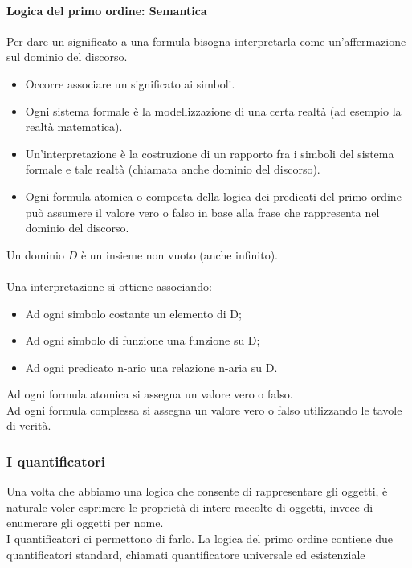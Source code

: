 \documentclass[../main.tex]{subfiles}
\begin{document}
	\paragraph{Logica del primo ordine: Semantica}
	Per dare un significato a una formula bisogna interpretarla come un’affermazione sul dominio del discorso.
	\begin{itemize}
		\item Occorre associare un significato ai simboli.
		\item Ogni sistema formale è la modellizzazione di una certa realtà (ad esempio la realtà matematica).
		\item Un’interpretazione è la costruzione di un rapporto fra i simboli del sistema formale e tale realtà (chiamata anche dominio del discorso).
		\item Ogni formula atomica o composta della logica dei predicati del primo ordine può assumere il valore vero o falso in base alla frase che rappresenta nel dominio del discorso.
	\end{itemize}
	Un dominio $D$ è un insieme non vuoto (anche infinito).\\\\
	Una interpretazione si ottiene associando:
	\begin{itemize}
		\item Ad ogni simbolo costante un elemento di D;
		\item Ad ogni simbolo di funzione una funzione su D;
		\item Ad ogni predicato n-ario una relazione n-aria su D.
	\end{itemize}
	Ad ogni formula atomica si assegna un valore vero o falso. \\
	Ad ogni formula complessa si assegna un valore vero o falso utilizzando le tavole di verità.
	\subsubsection{I quantificatori}
	Una volta che abbiamo una logica che consente di rappresentare gli oggetti, è naturale voler esprimere le proprietà di intere raccolte di oggetti, invece di enumerare gli oggetti per nome. \\
	I quantificatori ci permettono di farlo. La logica del primo ordine contiene due quantificatori standard, chiamati quantificatore universale ed esistenziale
\end{document}
